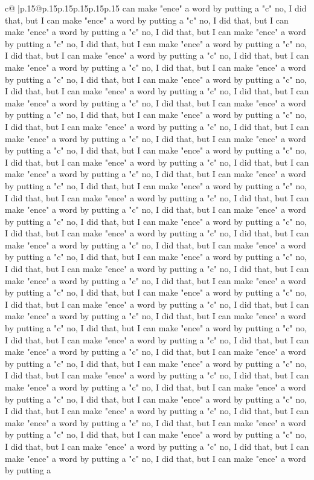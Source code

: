 \documentclass{article}
\begin{document}
{\begin{supertabular}{c@{$\;$}|p{.15\linewidth}@{}p{.15\linewidth}p{.15\linewidth}p{.15\linewidth}p{.15\linewidth}p{.15\linewidth}}
{{{can make "ence" a word by putting a "c" no, I did that, but I can make "ence" a word by putting a "c" no, I did that, but I can make "ence" a word by putting a "c" no, I did that, but I can make "ence" a word by putting a "c" no, I did that, but I can make "ence" a word by putting a "c" no, I did that, but I can make "ence" a word by putting a "c" no, I did that, but I can make "ence" a word by putting a "c" no, I did that, but I can make "ence" a word by putting a "c" no, I did that, but I can make "ence" a word by putting a "c" no, I did that, but I can make "ence" a word by putting a "c" no, I did that, but I can make "ence" a word by putting a "c" no, I did that, but I can make "ence" a word by putting a "c" no, I did that, but I can make "ence" a word by putting a "c" no, I did that, but I can make "ence" a word by putting a "c" no, I did that, but I can make "ence" a word by putting a "c" no, I did that, but I can make "ence" a word by putting a "c" no, I did that, but I can make "ence" a word by putting a "c" no, I did that, but I can make "ence" a word by putting a "c" no, I did that, but I can make "ence" a word by putting a "c" no, I did that, but I can make "ence" a word by putting a "c" no, I did that, but I can make "ence" a word by putting a "c" no, I did that, but I can make "ence" a word by putting a "c" no, I did that, but I can make "ence" a word by putting a "c" no, I did that, but I can make "ence" a word by putting a "c" no, I did that, but I can make "ence" a word by putting a "c" no, I did that, but I can make "ence" a word by putting a "c" no, I did that, but I can make "ence" a word by putting a "c" no, I did that, but I can make "ence" a word by putting a "c" no, I did that, but I can make "ence" a word by putting a "c" no, I did that, but I can make "ence" a word by putting a "c" no, I did that, but I can make "ence" a word by putting a "c" no, I did that, but I can make "ence" a word by putting a "c" no, I did that, but I can make "ence" a word by putting a "c" no, I did that, but I can make "ence" a word by putting a "c" no, I did that, but I can make "ence" a word by putting a "c" no, I did that, but I can make "ence" a word by putting a "c" no, I did that, but I can make "ence" a word by putting a "c" no, I did that, but I can make "ence" a word by putting a "c" no, I did that, but I can make "ence" a word by putting a "c" no, I did that, but I can make "ence" a word by putting a "c" no, I did that, but I can make "ence" a word by putting a "c" no, I did that, but I can make "ence" a word by putting a "c" no, I did that, but I can make "ence" a word by putting a "c" no, I did that, but I can make "ence" a word by putting a "c" no, I did that, but I can make "ence" a word by putting a "c" no, I did that, but I can make "ence" a word by putting a "c" no, I did that, but I can make "ence" a word by putting a "c" no, I did that, but I can make "ence" a word by putting a "c" no, I did that, but I can make "ence" a word by putting a "c" no, I did that, but I can make "ence" a word by putting a "c" no, I did that, but I can make "ence" a word by putting a "c" no, I did that, but I can make "ence" a word by putting a }}}
\end{supertabular}}
\end{document}
